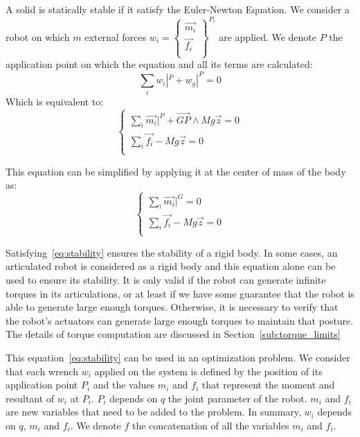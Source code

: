 A solid is statically stable if it satisfy the Euler-Newton Equation. We consider a robot on which $m$ external forces $w_i = \left\{ \begin{array}{r}
    \vec{m_i}\\
    \vec{f_i}\\
\end{array} \right\}^{P_i}$ are applied. We denote $P$ the application point on which the equation and all its terms are calculated:
\begin{equation}
  \sum\limits_i w_i|^P + w_g|^P = 0
\end{equation}
Which is equivalent to:
\begin{equation}
\left\{
\begin{array}{r}
  \sum\limits_i \vec{m_i}|^P + \overrightarrow{GP}\wedge Mg\vec{z} = 0 \\
  \sum\limits_i \vec{f_i} - Mg\vec{z} = 0 \\
\end{array}
\right.
\end{equation}

This equation can be simplified by applying it at the center of mass of the body as:
\begin{equation}
  \left\{
  \begin{array}{r}
    \sum\limits_i \vec{m_i}|^G = 0 \\
    \sum\limits_i \vec{f_i} - Mg\vec{z} = 0 \\
  \end{array}
  \right.
\label{eq:stability}
\end{equation}

Satisfying~\ref{eq:stability} ensures the stability of a rigid body.
In some cases, an articulated robot is considered as a rigid body and this equation alone can be used to ensure its stability.
It is only valid if the robot can generate infinite torques in its articulations, or at least if we have some guarantee that the robot is able to generate large enough torques.
Otherwise, it is necessary to verify that the robot's actuators can generate large enough torques to maintain that posture. The details of torque computation are discussed in Section~\ref{sub:torque_limits}

This equation~\ref{eq:stability} can be used in an optimization problem.
We consider that each wrench $w_i$ applied on the system is defined by the position of its application point $P_i$ and the values $m_i$ and $f_i$ that represent the moment and resultant of $w_i$ at $P_i$. $P_i$ depends on $q$ the joint parameter of the robot.
$m_i$ and $f_i$ are new variables that need to be added to the problem. In summary, $w_i$ depends on $q$, $m_i$ and $f_i$.
We denote $f$ the concatenation of all the variables $m_i$ and $f_i$.

